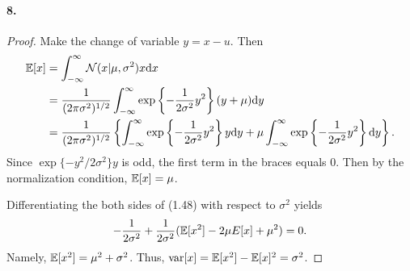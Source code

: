   \paragraph{8.}
  \begin{proof}
    Make the change of variable $y=x-u$. Then
    \begin{align*}
      \operatorname{\mathbb{E}}[x]
      &=\int_{-\infty}^\infty\mathcal{N}(x|\mu,\sigma^2)x\mathrm{d} x\\
      &=\frac{1}{(2\pi\sigma^2)^{1/2}}\int_{-\infty}^\infty
        \exp\left\{-\frac{1}{2\sigma^2}y^2\right\}(y+\mu)\mathrm{d} y\\
      &=\frac{1}{(2\pi\sigma^2)^{1/2}}\left\{
        \int_{-\infty}^\infty\exp\left\{-\frac{1}{2\sigma^2}y^2\right\}y\mathrm{d} y
        +\mu\int_{-\infty}^\infty\exp\left\{-\frac{1}{2\sigma^2}y^2\right\}\mathrm{d} y
        \right\}.
    \end{align*}
    Since $\exp\{-y^2/2\sigma^2\}y$ is odd, the first term in the braces equals
    $0$. Then by the normalization condition, $\operatorname{\mathbb{E}}[x]=\mu$.\par
    Differentiating the both sides of (1.48) with respect to $\sigma^2$ yields
    \[
      -\frac{1}{2\sigma^2}+\frac{1}{2\sigma^2}(\operatorname{\mathbb{E}}[x^2]-2\mu E[x]+\mu^2)=0.
    \]
    Namely, $\operatorname{\mathbb{E}}[x^2]=\mu^2+\sigma^2$. Thus, $\operatorname{var}[x]=\operatorname{\mathbb{E}}[x^2]-\operatorname{\mathbb{E}}[x]^2=
    \sigma^2$.
  \end{proof}

